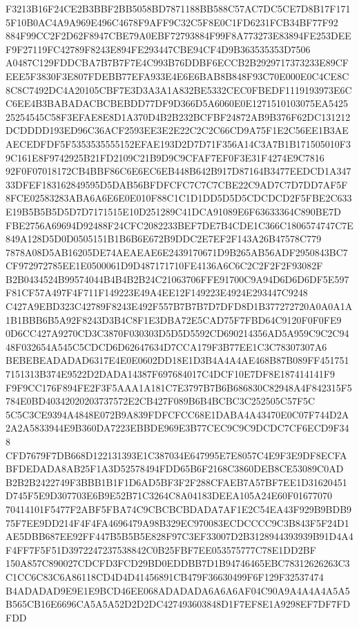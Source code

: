 \documentclass[UTF8,fontset=fandol,zihao=-4,a4paper]{ctexart}
\begin{document}
{{F3213B16F24CE2B3BBF2BB5058BD7871188BB588C57AC7DC5CE7D8B17F1715F10B0AC4A9A969E496C4678F9AFF9C32C5F8E0C1FD6231FCB34BF77F92
884F99CC2F2D62F8947CBE79A0EBF72793884F99F8A773273E83894FE253DEEF9F27119FC42789F8243E894FE293447CBE94CF4D9B363535353D7506
A0487C129FDDCBA7B7B7F7E4C993B76DDBF6ECCB2B2929717373233E89CFEEE5F3830F3E807FDEBB77EFA933E4E6E6BAB8B848F93C70E000E0C4CE8C
8C8C7492DC4A20105CBF7E3D3A3A1A832BE5332CEC0FBEDF1119193973E6CC6EE4B3BABADACBCBEBDD77DF9D366D5A6060E0E1271510103075EA5425
25254545C58F3EFAE8E8D1A370D4B2B232BCFBF24872AB9B376F62DC131212DCDDDD193ED96C36ACF2593EE3E2E22C2C2C66CD9A75F1E2C56EE1B3AE
AECEDFDF5F5353535555152EFAE193D2D7D71F356A14C3A7B1B171505010F39C161E8F9742925B21FD2109C21B9D9C9CFAF7EF0F3E31F4274E9C7816
92F0F07018172CB4BBF86C6E6EC6EB448B642B917D87164B3477EEDCD1A34733DFEF183162849595D5DAB56BFDFCFC7C7C7CBE22C9AD7C7D7DD7AF5F
8FCE02583283ABA6A6E6E0E010F88C1C1D1DD5D5D5CDCDCD2F5FBE2C633E19B5B5B5D5D7D7171515E10D251289C41DCA91089E6F63633364C890BE7D
FBE2756A69694D92488F24CFC2082233BEF7DE7B4CDE1C366C1806574747C7E849A128D5D0D0505151B1B6B6E672B9DDC2E7EF2F143A26B47578C779
7878A08D5AB16205DE74AEAEAE6E2439170671D9B265AB56ADF2950843BC7CF972972785EE1E0500061D9D487171710FE4136A6C6C2C2F2F2F93082F
B2B0434524B99574044B4B4B2B24C21063706FFE91700C9A94D6D6D6DF5E597F81CF57A497F4F711F149223E49A4EE12F149223E4924E293447C9248
C427A9EBD323C42789F8243E492F557B7B7B7D7DFD8D1B377272720A0A0A1A1B1BBB6B5A92F8243D3B4C8F1E3DBA72E5CAD75F7FBD64C9120F0F0FE9
0D6CC427A9270CD3C3870F030303D5D5D5592CD690214356AD5A959C9C2C9448F032654A545C5CDCD6D62647634D7CCA179F3B77EE1C3C78307307A6
BEBEBEADADAD6317E4E0E0602DD18E1D3B4A4A4AE468B87B089FF4517517151313B374E9522D2DADA14387F697684017C4DCF10E7DF8E187414141F9
F9F9CC176F894FE2F3F5AAA1A181C7E3797B7B6B686830C82948A4F842315F5784E0BD40342020203737572E2CB427F089B6B4BCBC3C252505C57F5C
5C5C3CE9394A4848E072B9A839FDFCFCC68E1DABA4A43470E0C07F744D2A2A2A5833944E9B360DA7223EBBDE969E3B77CEC9C9C9DCDC7CF6ECD9F348
CFD7679F7DB668D122131393E1C387034E647995E7E8057C4E9F3E9DF8ECFABFDEDADA8AB25F1A3D52578494FDD65B6F2168C3860DEB8CE53089C0AD
B2B2B2422749F3BBB1B1F1D6AD5BF3F2F288CFAEB7A57BF7EE1D31620451D745F5E9D307703E6B9E52B71C3264C8A04183DEEA105A24E60F01677070
70414101F5477F2ABF5FBA74C9CBCBCBDADA7AF1E2C54EA43F929B9BDB975F7EE9DD214F4F4FA4696479A98B329EC970083ECDCCCC9C3B843F5F24D1
AE5DBB687EE92FF447B5B5B5E828F97C3EF33007D2B3128944393939B91D4A4F4FF7F5F51D3972247237538842C0B25FBF7EE053575777C78E1DD2BF
150A857C890027CDCFD3FCD29BD0EDDBB7D1B94746465EBC78312626263C3C1CC6C83C6A86118CD4D4D41456891CB479F36630499F6F129F32537474
B4ADADAD9E9E1E9BCD46EE068ADADADA6A6A6AF04C90A9A4A4A4A5A5B565CB16E6696CA5A5A52D2D2DC427493603848D1F7EF8E1A9298EF7DF7FDFDD
}}
\end{document}
